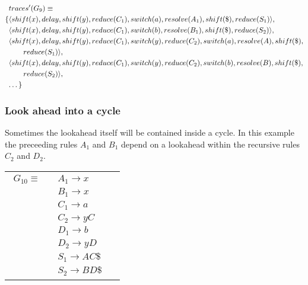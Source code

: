 \documentclass[envcountsame,runningheads]{llncs}
\begin{document}
{\small\parbox{.3\textwidth}{\begin{align*}
&traces^{\prime}(G_9) \equiv \\
\{ & \langle shift(x), delay, shift(y), reduce(C_1), switch(a), resolve(A_1), shift(\$), reduce(S_1) \rangle,\\
   & \langle shift(x), delay, shift(y), reduce(C_1), switch(b), resolve(B_1), shift(\$), reduce(S_2) \rangle,\\
   & \langle shift(x), delay, shift(y), reduce(C_1), switch(y), reduce(C_2), switch(a), resolve(A), shift(\$), \\&\qquad reduce(S_1) \rangle,\\
   & \langle shift(x), delay, shift(y), reduce(C_1), switch(y), reduce(C_2), switch(b), resolve(B), shift(\$), \\&\qquad reduce(S_2) \rangle,\\
   & \textellipsis \}
\end{align*}}}



\subsubsection{Look ahead into a cycle}
Sometimes the lookahead itself will be contained inside a cycle.
In this example the preceeding rules $A_1$ and $B_1$ depend on a lookahead within the recursive rules $C_2$ and $D_2$.

\begin{tabular}[t]{cl}
\parbox{.3\textwidth}{
\begin{align*}
G_{10} \equiv \quad & A_1 \rightarrow x\\
                  & B_1 \rightarrow x\\
                  & C_1 \rightarrow a\\
                  & C_2 \rightarrow y C\\
                  & D_1 \rightarrow b\\
                  & D_2 \rightarrow y D\\
                  & S_1 \rightarrow A C \$\\
                  & S_2 \rightarrow B D \$
\end{align*}}
\parbox{.6\textwidth}{}
\end{tabular}
\end{document}
